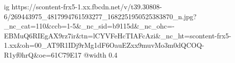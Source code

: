  
 
 
 
 

\ifcmt
  ig https://scontent-frx5-1.xx.fbcdn.net/v/t39.30808-6/269443975_4817994761593277_1682251950525383870_n.jpg?_nc_cat=110&ccb=1-5&_nc_sid=b9115d&_nc_ohc=-EBMuQ6RIEgAX9rz7ir&tn=lCYVFeHcTIAFcAzi&_nc_ht=scontent-frx5-1.xx&oh=00_AT9R1IDj9rMg1dF6OauEZxx9muvMo3m0dQCOQ-R1yf0hrQ&oe=61C79E17
  @width 0.4
\fi
